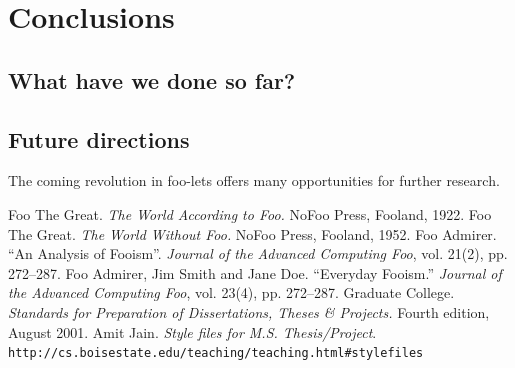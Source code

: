 \documentclass[proposal]{bsu-ms}
\begin{document}
\chapter{Conclusions}


\section{What have we done so far?}

\section{Future directions}
The coming revolution in foo-lets offers many opportunities for further
research.

\backmatter

%
%





%
%



\begin{thebibliography}{99} 
\label{references}
 Foo The Great. {\em The World According to Foo.} NoFoo
Press, Fooland, 1922.
 Foo The Great. {\em The World Without Foo.} NoFoo
Press, Fooland, 1952.
 Foo Admirer. ``An Analysis of Fooism''. {\em Journal of the
Advanced Computing Foo}, vol. 21(2), pp. 272--287.
 Foo Admirer, Jim Smith and Jane Doe. ``Everyday
Fooism.'' {\em Journal of the Advanced Computing Foo}, vol. 23(4),
pp. 272--287.
 Graduate College. {\em Standards for Preparation of Dissertations, Theses \&
Projects.} Fourth edition, August 2001.
 Amit Jain. {\em Style files for M.S. Thesis/Project}.\\ \texttt{http://cs.boisestate.edu/teaching/teaching.html\#stylefiles}
\end{thebibliography}
\end{document}
